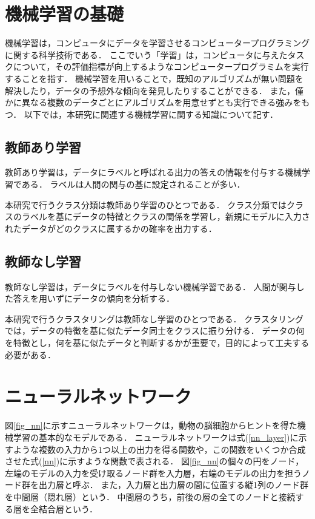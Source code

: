 \documentclass[12pt,a4j,dvipdfmx]{jreport}
\begin{document}

\section{機械学習の基礎}
機械学習は，コンピュータにデータを学習させるコンピュータープログラミングに関する科学技術である\cite{aurellen20}．
ここでいう「学習」は，コンピュータに与えたタスクについて，その評価指標が向上するようなコンピュータープログラミムを実行することを指す．
機械学習を用いることで，既知のアルゴリズムが無い問題を解決したり，データの予想外な傾向を発見したりすることができる．
また，僅かに異なる複数のデータごとにアルゴリズムを用意せずとも実行できる強みをもつ．
以下では，本研究に関連する機械学習に関する知識について記す．


\subsection{教師あり学習}
教師あり学習は，データにラベルと呼ばれる出力の答えの情報を付与する機械学習である\cite{aurellen20}．
ラベルは人間の関与の基に設定されることが多い．

本研究で行うクラス分類は教師あり学習のひとつである．
クラス分類ではクラスのラベルを基にデータの特徴とクラスの関係を学習し，新規にモデルに入力されたデータがどのクラスに属するかの確率を出力する．

\subsection{教師なし学習}
教師なし学習は，データにラベルを付与しない機械学習である\cite{aurellen20}．
人間が関与した答えを用いずにデータの傾向を分析する．

本研究で行うクラスタリングは教師なし学習のひとつである．
クラスタリングでは，データの特徴を基に似たデータ同士をクラスに振り分ける．
データの何を特徴とし，何を基に似たデータと判断するかが重要で，目的によって工夫する必要がある．


\section{ニューラルネットワーク}
図\ref{fig_nn}に示すニューラルネットワークは，動物の脳細胞からヒントを得た機械学習の基本的なモデルである\cite{aurellen20}．
ニューラルネットワークは式(\ref{nn_layer})に示すような複数の入力から1つ以上の出力を得る関数や，この関数をいくつか合成させた式(\ref{nn})に示すような関数で表される．
図\ref{fig_nn}の個々の円をノード，左端のモデルの入力を受け取るノード群を入力層，右端のモデルの出力を担うノード群を出力層と呼ぶ．
また，入力層と出力層の間に位置する縦1列のノード群を中間層（隠れ層）という．
中間層のうち，前後の層の全てのノードと接続する層を全結合層という．
\end{document}
